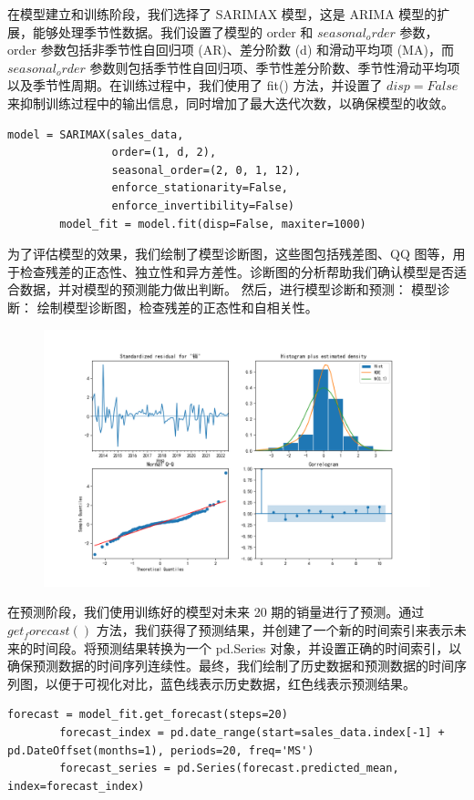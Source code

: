 \documentclass[a4paper]{article}
\begin{document}
	在模型建立和训练阶段，我们选择了 SARIMAX 模型，这是 ARIMA 模型的扩展，能够处理季节性数据。我们设置了模型的 order 和 $seasonal_order$ 参数，order 参数包括非季节性自回归项 (AR)、差分阶数 (d) 和滑动平均项 (MA)，而 $seasonal_order$ 参数则包括季节性自回归项、季节性差分阶数、季节性滑动平均项以及季节性周期。在训练过程中，我们使用了 fit() 方法，并设置了 $disp=False$ 来抑制训练过程中的输出信息，同时增加了最大迭代次数，以确保模型的收敛。
	\begin{lstlisting}[caption={Python Example}, label={lst:example}]
		model = SARIMAX(sales_data,
                order=(1, d, 2),
                seasonal_order=(2, 0, 1, 12),
                enforce_stationarity=False,
                enforce_invertibility=False)
		model_fit = model.fit(disp=False, maxiter=1000)
	\end{lstlisting}
	为了评估模型的效果，我们绘制了模型诊断图，这些图包括残差图、QQ 图等，用于检查残差的正态性、独立性和异方差性。诊断图的分析帮助我们确认模型是否适合数据，并对模型的预测能力做出判断。
	然后，进行模型诊断和预测：
	模型诊断：
	绘制模型诊断图，检查残差的正态性和自相关性。

	\begin{figure}[H]
		\centering
		\includegraphics[width=1.0\textwidth]{img/A1_1.png}
	\end{figure}

	在预测阶段，我们使用训练好的模型对未来 20 期的销量进行了预测。通过 $get_forecast()$ 方法，我们获得了预测结果，并创建了一个新的时间索引来表示未来的时间段。将预测结果转换为一个 pd.Series 对象，并设置正确的时间索引，以确保预测数据的时间序列连续性。最终，我们绘制了历史数据和预测数据的时间序列图，以便于可视化对比，蓝色线表示历史数据，红色线表示预测结果。
	\begin{lstlisting}[caption={Python Example}, label={lst:example}]
		forecast = model_fit.get_forecast(steps=20)
		forecast_index = pd.date_range(start=sales_data.index[-1] + pd.DateOffset(months=1), periods=20, freq='MS')
		forecast_series = pd.Series(forecast.predicted_mean, index=forecast_index)
	\end{lstlisting}
\end{document}
